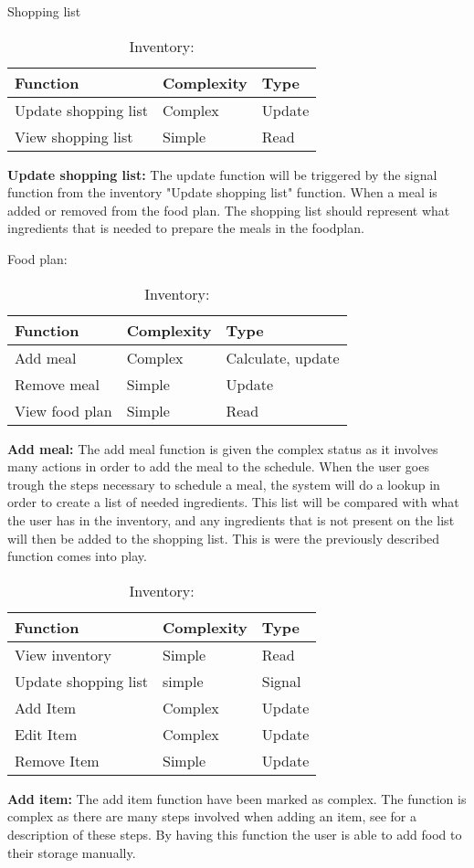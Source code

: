 \begin{table}[H]
	\centering
	\caption{Shopping list}
	\begin{tabular}{|l|l|l|}\hline
		\textbf{Function}&\textbf{Complexity}&\textbf{Type}\\\hline
	  Update shopping list  &  Complex & Update \\\hline
	  View shopping list    &  Simple  & Read   \\\hline
  \end{tabular}
  \begin{flushleft}
    \textbf{Update shopping list:} The update function will be triggered by the signal function from the inventory "Update shopping list" function. When a meal is added or removed from the food plan. The shopping list should represent what ingredients that is needed to prepare the meals in the foodplan.
  \end{flushleft}
	\caption{Food plan:}
  \begin{tabular}{|l|l|l|}\hline
		\textbf{Function}&\textbf{Complexity}&\textbf{Type}\\\hline
	  Add meal              &  Complex & Calculate, update \\\hline
	  Remove meal           &  Simple  & Update            \\\hline
	  View food plan        &  Simple  & Read              \\\hline
  \end{tabular}
  \begin{flushleft}
    \textbf{Add meal:} The add meal function is given the complex status as it involves many actions in order to add the meal to the schedule. When the user goes trough the steps necessary to schedule a meal, the system will do a lookup in order to create a list of needed ingredients. This list will be compared with what the user has in the inventory, and any ingredients that is not present on the list will then be added to the shopping list. This is were the previously described function comes into play.
  \end{flushleft}
	\caption{Inventory:}
  \begin{tabular}{|l|l|l|}\hline
		\textbf{Function}&\textbf{Complexity}&\textbf{Type}\\\hline
	  View inventory        &  Simple  & Read   \\\hline
	  Update shopping list  &  simple  & Signal \\\hline
	  Add Item              &  Complex & Update \\\hline
	  Edit Item             &  Complex & Update \\\hline
	  Remove Item           &  Simple  & Update \\\hline
  \end{tabular}
  \begin{flushleft}  	  
    \textbf{Add item:} The add item function have been marked as complex. The function is complex as there are many steps involved when adding an item, see  for a description of these steps. By having this function the user is able to add food to their storage manually.
    

\end{flushleft}
\end{table}
